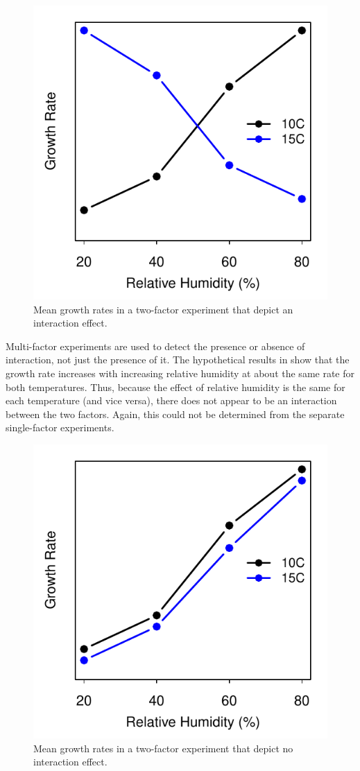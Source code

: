 \documentclass[10pt,openany]{book}\usepackage[]{graphicx}\usepackage[]{color}
\newenvironment{knitrout}{}{} %
\begin{document}
\begin{knitrout}
\color{fgcolor}\begin{figure}[hbtp]

{\centering \includegraphics[width=.4\linewidth]{Figs/ExpDInt-1} 

}

\caption[Mean growth rates in a two-factor experiment that depict an interaction effect]{Mean growth rates in a two-factor experiment that depict an interaction effect.}\label{fig:ExpDInt}
\end{figure}


\end{knitrout}
\vspace{9pt} %

Multi-factor experiments are used to detect the presence or absence of interaction, not just the presence of it. The hypothetical results in  show that the growth rate increases with increasing relative humidity at about the same rate for both temperatures. Thus, because the effect of relative humidity is the same for each temperature (and vice versa), there does not appear to be an interaction between the two factors. Again, this could not be determined from the separate single-factor experiments.

\begin{knitrout}
\color{fgcolor}\begin{figure}[hbtp]

{\centering \includegraphics[width=.4\linewidth]{Figs/ExpDNoInt-1} 

}

\caption[Mean growth rates in a two-factor experiment that depict no interaction effect]{Mean growth rates in a two-factor experiment that depict no interaction effect.}\label{fig:ExpDNoInt}
\end{figure}


\end{knitrout}
\end{document}
